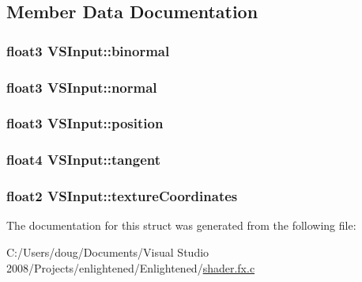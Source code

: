 \subsection{Member Data Documentation}
\hypertarget{struct_v_s_input_aef4a4114e46e037f6b4d624da7915e7c}{
\subsubsection[{binormal}]{\setlength{\rightskip}{0pt plus 5cm}float3 {\bf VSInput::binormal}}}
\label{struct_v_s_input_aef4a4114e46e037f6b4d624da7915e7c}
\hypertarget{struct_v_s_input_a35455e47d232796105794746b83411a2}{
\subsubsection[{normal}]{\setlength{\rightskip}{0pt plus 5cm}float3 {\bf VSInput::normal}}}
\label{struct_v_s_input_a35455e47d232796105794746b83411a2}
\hypertarget{struct_v_s_input_aed491629cd84dfab85cf7183f180e91b}{
\subsubsection[{position}]{\setlength{\rightskip}{0pt plus 5cm}float3 {\bf VSInput::position}}}
\label{struct_v_s_input_aed491629cd84dfab85cf7183f180e91b}
\hypertarget{struct_v_s_input_ae40739bf6da27046f3de2cf11d37a23a}{
\subsubsection[{tangent}]{\setlength{\rightskip}{0pt plus 5cm}float4 {\bf VSInput::tangent}}}
\label{struct_v_s_input_ae40739bf6da27046f3de2cf11d37a23a}
\hypertarget{struct_v_s_input_a30e05320d62b757f513169849d45410f}{
\subsubsection[{textureCoordinates}]{\setlength{\rightskip}{0pt plus 5cm}float2 {\bf VSInput::textureCoordinates}}}
\label{struct_v_s_input_a30e05320d62b757f513169849d45410f}


The documentation for this struct was generated from the following file:\begin{DoxyCompactItemize}
\item 
C:/Users/doug/Documents/Visual Studio 2008/Projects/enlightened/Enlightened/\hyperlink{shader_8fx_8c}{shader.fx.c}\end{DoxyCompactItemize}

